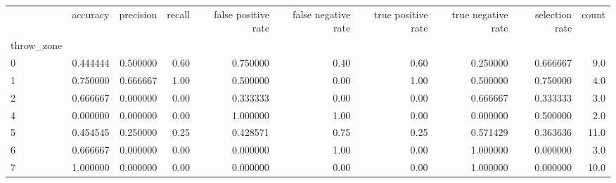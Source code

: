 \begin{tabular}{lrrrrrrrrr}
\toprule
{} &  accuracy &  precision &  recall &  false positive rate &  false negative rate &  true positive rate &  true negative rate &  selection rate &  count \\
throw\_zone &           &            &         &                      &                      &                     &                     &                 &        \\
\midrule
0          &  0.444444 &   0.500000 &    0.60 &             0.750000 &                 0.40 &                0.60 &            0.250000 &        0.666667 &    9.0 \\
1          &  0.750000 &   0.666667 &    1.00 &             0.500000 &                 0.00 &                1.00 &            0.500000 &        0.750000 &    4.0 \\
2          &  0.666667 &   0.000000 &    0.00 &             0.333333 &                 0.00 &                0.00 &            0.666667 &        0.333333 &    3.0 \\
4          &  0.000000 &   0.000000 &    0.00 &             1.000000 &                 1.00 &                0.00 &            0.000000 &        0.500000 &    2.0 \\
5          &  0.454545 &   0.250000 &    0.25 &             0.428571 &                 0.75 &                0.25 &            0.571429 &        0.363636 &   11.0 \\
6          &  0.666667 &   0.000000 &    0.00 &             0.000000 &                 1.00 &                0.00 &            1.000000 &        0.000000 &    3.0 \\
7          &  1.000000 &   0.000000 &    0.00 &             0.000000 &                 0.00 &                0.00 &            1.000000 &        0.000000 &   10.0 \\
\bottomrule
\end{tabular}
